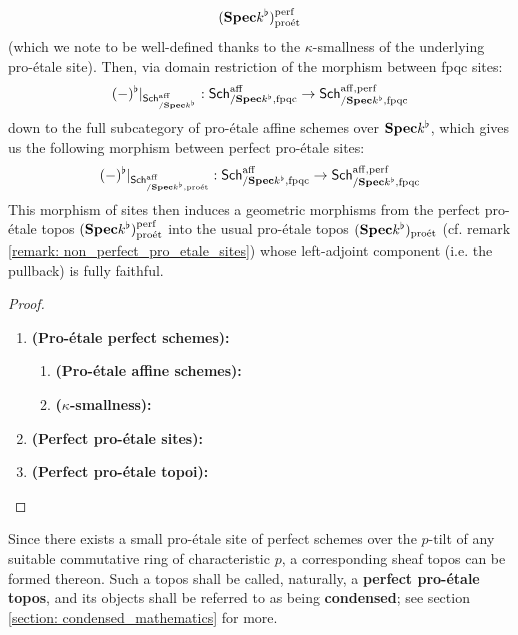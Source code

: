 \begin{proposition}
\begin{enumerate}
                            $$(\mathbf{Spec} k^{\flat})^{\mathrm{perf}}_{\mathrm{pro\acute{e}t}}$$
                        (which we note to be well-defined thanks to the $\kappa$-smallness of the underlying pro-\'etale site). Then, via domain restriction of the morphism between fpqc sites:
                            $$(-)^{\flat}|_{\mathsf{Sch}^{\mathrm{aff}}_{/\mathbf{Spec} k^{\flat}}}: \mathsf{Sch}^{\mathrm{aff}}_{/\mathbf{Spec} k^{\flat}, \mathrm{fpqc}} \to \mathsf{Sch}^{\mathrm{aff}, \mathrm{perf}}_{/\mathbf{Spec} k^{\flat}, \mathrm{fpqc}}$$
                        down to the full subcategory of pro-\'etale affine schemes over $\mathbf{Spec} k^{\flat}$, which gives us the following morphism between perfect pro-\'etale sites:
                            $$(-)^{\flat}|_{\mathsf{Sch}^{\mathrm{aff}}_{/\mathbf{Spec} k^{\flat}, \mathrm{pro\acute{e}t}}}: \mathsf{Sch}^{\mathrm{aff}}_{/\mathbf{Spec} k^{\flat}, \mathrm{fpqc}} \to \mathsf{Sch}^{\mathrm{aff}, \mathrm{perf}}_{/\mathbf{Spec} k^{\flat}, \mathrm{fpqc}}$$
                        This morphism of sites then induces a geometric morphisms from the perfect pro-\'etale topos $(\mathbf{Spec} k^{\flat})^{\mathrm{perf}}_{\mathrm{pro\acute{e}t}}$ into the usual pro-\'etale topos $(\mathbf{Spec} k^{\flat})_{\mathrm{pro\acute{e}t}}$ (cf. remark \ref{remark: non_perfect_pro_etale_sites}) whose left-adjoint component (i.e. the pullback) is fully faithful.
                    \end{enumerate}
                \end{proposition}
                    \begin{proof}
                        \noindent
                        \begin{enumerate}
                            \item \textbf{(Pro-\'etale perfect schemes):}
                                \begin{enumerate}
                                    \item \textbf{(Pro-\'etale affine schemes):} 
                                    \item \textbf{($\kappa$-smallness):}
                                \end{enumerate}
                            \item \textbf{(Perfect pro-\'etale sites):}
                            \item \textbf{(Perfect pro-\'etale topoi):}
                        \end{enumerate}
                    \end{proof}
                \begin{corollary} \label{coro: pro_etale_topoi}
                    Since there exists a small pro-\'etale site of perfect schemes over the $p$-tilt of any suitable commutative ring of characteristic $p$, a corresponding sheaf topos can be formed thereon. Such a topos shall be called, naturally, a \textbf{perfect pro-\'etale topos}, and its objects shall be referred to as being \textbf{condensed}; see section \ref{section: condensed_mathematics} for more. 
                \end{corollary}
